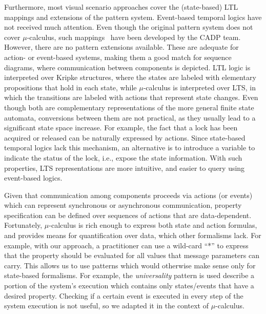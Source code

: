 \documentclass[letter]{llncs}
\begin{document}
Furthermore, most visual scenario approaches cover the (state-based) LTL mappings and extensions of the pattern system. 
Event-based temporal logics have not received much attention. Even though the original pattern 
system does not cover $\mu$-calculus, such mappings~\cite{RAFMC} have been developed by the CADP team.
However, there are no pattern extensions available. These are adequate for action- or event-based systems,
making them a good match for sequence diagrams, where communication between components is depicted.
LTL logic is interpreted over Kripke structures, where the states are labeled with elementary 
propositions that hold in each state, while $\mu$-calculus is interpreted over LTS, in which the transitions
are labeled with actions that represent state changes.
Even though both are complementary representations of the more general finite state automata, 
conversions between them are not practical, as they usually lead to a significant state space increase. 
For example, the fact that a lock has
been acquired or released can be naturally expressed by actions. Since state-based
temporal logics lack this mechanism, an alternative is to introduce a variable to indicate
the status of the lock, i.e., expose the state information. With such properties, LTS
representations are more intuitive, and easier to query using event-based logics.

Given that communication among components proceeds via actions (or events) which can
represent synchronous or asynchronous communication, property specification
can be defined over sequences of actions that are data-dependent.
Fortunately, $\mu$-calculus is rich enough to express both state and action formulas,
and provides means for quantification over data, which other formalisms lack. 
For example, with our approach, a practitioner can use 
a wild-card ``*'' to express that the property should be evaluated for all values
that message parameters can carry. This allows us to use patterns which would otherwise
make sense only for state-based formalisms. For example, the \emph{universality}
pattern is used describe a portion of the system's execution which contains only states/events that have a desired property.
Checking if a certain event is executed in every step of the system execution is not useful,
so we adapted it in the context of $\mu$-calculus. 

\end{document}
